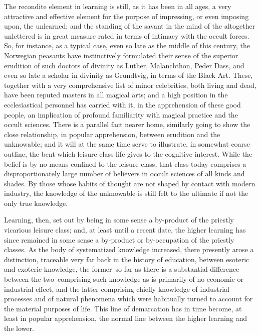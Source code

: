 \documentclass[12pt]{report}
\begin{document}
The recondite element in learning is still, as it has been in all ages,
a very attractive and effective element for the purpose of impressing,
or even imposing upon, the unlearned; and the standing of the savant in
the mind of the altogether unlettered is in great measure rated in terms
of intimacy with the occult forces. So, for instance, as a typical case,
even so late as the middle of this century, the Norwegian peasants have
instinctively formulated their sense of the superior erudition of such
doctors of divinity as Luther, Malanchthon, Peder Dass, and even so late
a scholar in divinity as Grundtvig, in terms of the Black Art. These,
together with a very comprehensive list of minor celebrities, both
living and dead, have been reputed masters in all magical arts; and a
high position in the ecclesiastical personnel has carried with it,
in the apprehension of these good people, an implication of profound
familiarity with magical practice and the occult sciences. There is
a parallel fact nearer home, similarly going to show the close
relationship, in popular apprehension, between erudition and the
unknowable; and it will at the same time serve to illustrate, in
somewhat coarse outline, the bent which leisure-class life gives to
the cognitive interest. While the belief is by no means confined to the
leisure class, that class today comprises a disproportionately large
number of believers in occult sciences of all kinds and shades. By those
whose habits of thought are not shaped by contact with modern industry,
the knowledge of the unknowable is still felt to the ultimate if not the
only true knowledge.

Learning, then, set out by being in some sense a by-product of the
priestly vicarious leisure class; and, at least until a recent date,
the higher learning has since remained in some sense a by-product or
by-occupation of the priestly classes. As the body of systematized
knowledge increased, there presently arose a distinction, traceable
very far back in the history of education, between esoteric and exoteric
knowledge, the former--so far as there is a substantial difference
between the two--comprising such knowledge as is primarily of no
economic or industrial effect, and the latter comprising chiefly
knowledge of industrial processes and of natural phenomena which were
habitually turned to account for the material purposes of life.
This line of demarcation has in time become, at least in popular
apprehension, the normal line between the higher learning and the lower.
\end{document}
